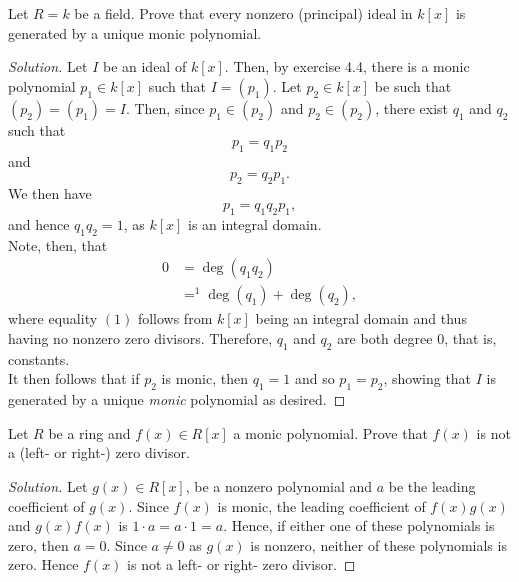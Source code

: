 \documentclass[12pt]{article}
\newenvironment{problem}[2][Problem]{\begin{trivlist}
\item[\hskip \labelsep {\bfseries #1}\hskip \labelsep {\bfseries #2.}]}{\end{trivlist}}
\newenvironment{solution}
  {\renewcommand\qedsymbol{$\blacksquare$}\begin{proof}[Solution]}
{\end{proof}}
\theoremstyle{remark}
\begin{document}
\begin{problem}{4.7}
  Let $R=k$ be a field.
  Prove that every nonzero (principal) ideal in $k[x]$ is generated
  by a unique monic polynomial.
\end{problem}
\begin{solution}
  Let $I$ be an ideal of $k[x]$.
  Then, by exercise 4.4, there is a monic polynomial $p_1\in k[x]$ such
  that $I=(p_1)$.
  Let $p_2\in k[x]$ be such that $(p_2)=(p_1)=I$.
  Then, since $p_1\in (p_2)$ and $p_2\in (p_2)$, there exist $q_1$
  and $q_2$ such that $$p_1=q_1p_2$$ and $$p_2=q_2p_1.$$
  We then have $$p_1=q_1q_2p_1,$$ and hence $q_1q_2=1$, as $k[x]$
  is an integral domain.\\
  \indent Note, then, that 
  \begin{align*}
    0 &= \deg(q_1q_2)\\
    &=^1 \deg(q_1)+\deg(q_2),
  \end{align*}
  where equality $(1)$ follows from $k[x]$ being an integral domain and thus
  having no nonzero zero divisors.
  Therefore, $q_1$ and $q_2$ are both degree 0, that is, constants. \\
  \indent It then follows that if $p_2$ is monic, then $q_1 = 1$ and
  so $p_1=p_2$, showing that $I$ is generated by a unique \textit{monic}
  polynomial as desired.
\end{solution}

\begin{problem}{4.8}
  Let $R$ be a ring and $f(x)\in R[x]$ a monic polynomial.
  Prove that $f(x)$ is not a (left- or right-) zero divisor.
\end{problem}
\begin{solution}
  Let $g(x)\in R[x]$, be a nonzero polynomial and $a$ be the leading 
  coefficient of $g(x)$.
  Since $f(x)$ is monic, the leading coefficient of $f(x)g(x)$ and 
  $g(x)f(x)$ is $1\cdot a=a\cdot1=a$.
  Hence, if either one of these polynomials is zero, then $a=0$.
  Since $a\neq 0$ as $g(x)$ is nonzero, neither of these polynomials is zero.
  Hence $f(x)$ is not a left- or right- zero divisor.
\end{solution}

\newpage
\end{document}
